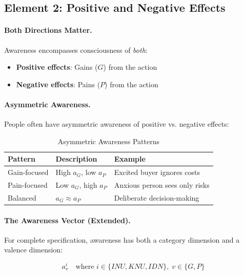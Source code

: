 \subsection{Element 2: Positive and Negative Effects}
\label{subsec:positive-negative}

\paragraph{Both Directions Matter.}
Awareness encompasses consciousness of \emph{both}:
\begin{itemize}
\item \textbf{Positive effects}: Gains ($G$) from the action
\item \textbf{Negative effects}: Pains ($P$) from the action
\end{itemize}

\paragraph{Asymmetric Awareness.}
People often have asymmetric awareness of positive vs. negative effects:

\begin{table}[htbp]
\centering
\caption{Asymmetric Awareness Patterns}
\label{tab:asymmetric-awareness}
\renewcommand{\arraystretch}{1.3}
\begin{tabular}{@{}lll@{}}
\toprule
\textbf{Pattern} & \textbf{Description} & \textbf{Example} \\
\midrule
Gain-focused & High $a_G$, low $a_P$ & Excited buyer ignores costs \\
Pain-focused & Low $a_G$, high $a_P$ & Anxious person sees only risks \\
Balanced & $a_G \approx a_P$ & Deliberate decision-making \\
\bottomrule
\end{tabular}
\end{table}

\paragraph{The Awareness Vector (Extended).}
For complete specification, awareness has both a category dimension and 
a valence dimension:

\begin{equation}
a^i_v \quad \text{where } i \in \{INU, KNU, IDN\}, \; v \in \{G, P\}
\end{equation}

